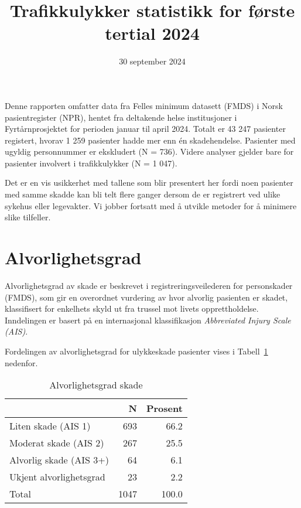 \documentclass[
  letterpaper,
  DIV=11,
  numbers=noendperiod]{scrartcl}
\title{Trafikkulykker statistikk for første tertial 2024}
\subtitle{30 september 2024}
\author{}
\date{}
\begin{document}
\maketitle


Denne rapporten omfatter data fra Felles minimum datasett (FMDS) i Norsk
pasientregister (NPR), hentet fra deltakende helse institusjoner i
Fyrtårnprosjektet for perioden januar til april 2024. Totalt er 43 247
pasienter registert, hvorav 1 259 pasienter hadde mer enn én
skadehendelse. Pasienter med ugyldig personnummer er ekskludert (N =
736). Videre analyser gjelder bare for pasienter involvert i
trafikkulykker (N = 1 047).

Det er en vis usikkerhet med tallene som blir presentert her fordi noen
pasienter med samme skadde kan bli telt flere ganger dersom de er
registrert ved ulike sykehus eller legevakter. Vi jobber fortsatt med å
utvikle metoder for å minimere slike tilfeller.

\section{Alvorlighetsgrad}\label{alvorlighetsgrad}

Alvorlighetsgrad av skade er beskrevet i registreringsveilederen for
personskader (FMDS), som gir en overordnet vurdering av hvor alvorlig
pasienten er skadet, klassifisert for enkelhets skyld ut fra trussel mot
livets opprettholdelse. Inndelingen er basert på en internasjonal
klassifikasjon \emph{Abbreviated Injury Scale (AIS)}.

Fordelingen av alvorlighetsgrad for ulykkeskade pasienter vises i
Tabell~\ref{tbl-alvorlig} nedenfor.

\begingroup
\fontsize{12.0pt}{14.4pt}\selectfont

\begin{longtable}{lrr}

\caption{\label{tbl-alvorlig}Alvorlighetsgrad skade}

\tabularnewline

\toprule
  & N & Prosent \\ 
\midrule\addlinespace[2.5pt]
Liten skade (AIS 1) & 693 & 66.2 \\ 
Moderat skade (AIS 2) & 267 & 25.5 \\ 
Alvorlig skade (AIS 3+) & 64 & 6.1 \\ 
Ukjent alvorlighetsgrad & 23 & 2.2 \\ 
Total & 1047 & 100.0 \\ 
\bottomrule

\end{longtable}
\end{document}
